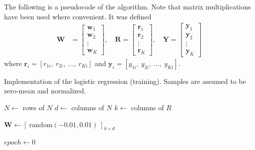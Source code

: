 The following is a pseudocode of the algorithm. 
Note that matrix multiplications have been used where convenient.
It was defined
%
\begin{align}
    \mathbf{W} &= 
    \begin{bmatrix}
        \mathbf{w}_1 \\ \mathbf{w}_2 \\ \vdots \\ \mathbf{w}_K
    \end{bmatrix}, 
\quad
    \mathbf{R} = 
    \begin{bmatrix}
        \mathbf{r}_1 \\ \mathbf{r}_2 \\ \vdots \\ \mathbf{r}_K
    \end{bmatrix}, 
\quad
    \mathbf{Y} = 
    \begin{bmatrix}
        \mathbf{y}_1 \\ \mathbf{y}_2 \\ \vdots \\ \mathbf{y}_K
    \end{bmatrix}
\end{align}
%
where
$\mathbf{r}_i = [r_{1i},\ r_{2i},\ \dots,\ r_{Ki}]$ and
$\mathbf{y}_i = [y_{1i},\ y_{2i},\ \dots,\ y_{Ki}]$.

\begin{algorithm}
    \caption{
        Implementation of the logistic regression (training). 
        Samples are assumed to be zero-mean and normalized.
    }
    \label{alg:logistic-regression}


    $N \gets$ rows of $N$\;
    $d \gets$ columns of $N$\;
    $k \gets$ columns of $R$\;

    $\mathbf{W} \gets [\ \mathrm{random}(-0.01, 0.01)\ ]_{k\times d}$ 

    $epoch \gets 0$\;
\end{algorithm}

